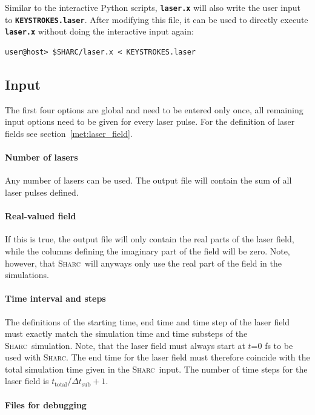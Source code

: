 \documentclass[a4paper,10pt,DIV=15,openany,twoside=false]{scrbook}
\newcommand{\sharc}{\textsc{Sharc}}
\newcommand{\ttt}[1]{\textbf{\texttt{#1}}}
\begin{document}
Similar to the interactive Python scripts, \ttt{laser.x} will also write the user input to \ttt{KEYSTROKES.laser}. After modifying this file, it can be used to directly execute \ttt{laser.x} without doing the interactive input again:
\begin{verbatim}
user@host> $SHARC/laser.x < KEYSTROKES.laser
\end{verbatim}

\subsection{Input}

The first four options are global and need to be entered only once, all remaining input options need to be given for every laser pulse. For the definition of laser fields see section~\ref{met:laser_field}.

\paragraph{Number of lasers}

Any number of lasers can be used. The output file will contain the sum of all laser pulses defined.

\paragraph{Real-valued field}

If this is true, the output file will only contain the real parts of the laser field, while the columns defining the imaginary part of the field will be zero. Note, however, that \sharc\ will anyways only use the real part of the field in the simulations.

\paragraph{Time interval and steps}

The definitions of the starting time, end time and time step of the laser field must exactly match the simulation time and time substeps of the \sharc\ simulation. Note, that the laser field must always start at $t$=0 fs to be used with \sharc. The end time for the laser field must therefore coincide with the total simulation time given in the \sharc\ input. The number of time steps for the laser field is $t_\text{total}/\Delta t_\text{sub} +1$.

\paragraph{Files for debugging}
\end{document}
